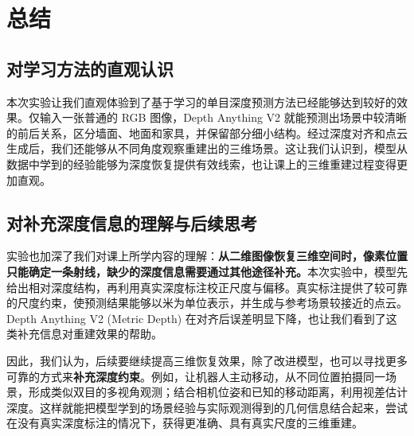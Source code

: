 \clearpage
\section{总结}

\subsection{对学习方法的直观认识}

本次实验让我们直观体验到了基于学习的单目深度预测方法已经能够达到较好的效果。仅输入一张普通的 RGB 图像，Depth Anything V2 就能预测出场景中较清晰的前后关系，区分墙面、地面和家具，并保留部分细小结构。经过深度对齐和点云生成后，我们还能够从不同角度观察重建出的三维场景。这让我们认识到，模型从数据中学到的经验能够为深度恢复提供有效线索，也让课上的三维重建过程变得更加直观。

\subsection{对补充深度信息的理解与后续思考}

实验也加深了我们对课上所学内容的理解：\textbf{从二维图像恢复三维空间时，像素位置只能确定一条射线，缺少的深度信息需要通过其他途径补充。}本次实验中，模型先给出相对深度结构，再利用真实深度标注校正尺度与偏移。真实标注提供了较可靠的尺度约束，使预测结果能够以米为单位表示，并生成与参考场景较接近的点云。Depth Anything V2 (Metric Depth) 在对齐后误差明显下降，也让我们看到了这类补充信息对重建效果的帮助。

因此，我们认为，后续要继续提高三维恢复效果，除了改进模型，也可以寻找更多可靠的方式来\textbf{补充深度约束}。例如，让机器人主动移动，从不同位置拍摄同一场景，形成类似双目的多视角观测；结合相机位姿和已知的移动距离，利用视差估计深度。这样就能把模型学到的场景经验与实际观测得到的几何信息结合起来，尝试在没有真实深度标注的情况下，获得更准确、具有真实尺度的三维重建。
